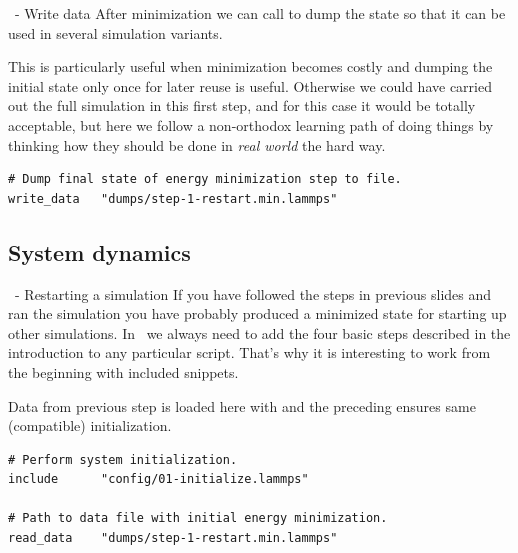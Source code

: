 \begin{frame}[fragile]{\secname}{\subsecname\ - Write data}
After minimization we can call  to dump the state so that it can be used in several simulation variants.

\vspace{0.5cm}

This is particularly useful when minimization becomes costly and dumping the initial state only once for later reuse is useful. Otherwise we could have carried out the full simulation in this first step, and for this case it would be totally acceptable, but here we follow a non-orthodox learning path of doing things by thinking how they should be done in \emph{real world} the hard way.

\vspace{0.5cm}

\begin{lstlisting}[language=LAMMPS,basicstyle=\small]
# Dump final state of energy minimization step to file.
write_data   "dumps/step-1-restart.min.lammps"
\end{lstlisting}
\end{frame}

\subsection{System dynamics}

\begin{frame}[fragile]{\secname}{\subsecname\ - Restarting a simulation}
If you have followed the steps in previous slides and ran the simulation you have probably produced a minimized state for starting up other simulations. In \LAMMPS\ we always need to add the four basic steps described in the introduction to any particular script. That's why it is interesting to work from the beginning with included snippets.

\vspace{0.5cm}

Data from previous step is loaded here with  and the preceding  ensures same (compatible) initialization.

\vspace{0.5cm}

\begin{lstlisting}[language=LAMMPS,basicstyle=\small]
# Perform system initialization.
include      "config/01-initialize.lammps"

# Path to data file with initial energy minimization.
read_data    "dumps/step-1-restart.min.lammps"
\end{lstlisting}
\end{frame}

